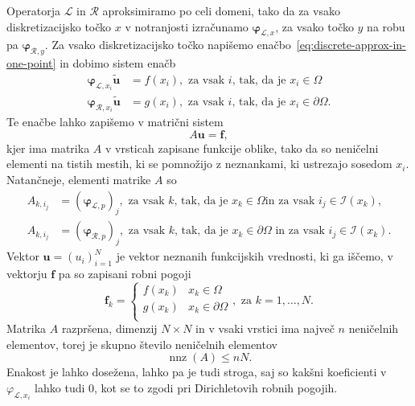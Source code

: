 \documentclass[12pt,a4paper,twoside]{article}
\theoremstyle{definition} %
\theoremstyle{plain} %
\numberwithin{equation}{section}
\newcommand{\Rc}{\mathcal{R}}
\newcommand{\I}{\mathcal{I}}
\renewcommand{\L}{\mathcal{L}}
\renewcommand{\b}{\boldsymbol}
\renewcommand{\phi}{\varphi}
\DeclareMathOperator{\nnz}{nnz}
\begin{document}
Operatorja $\L$ in $\Rc$ aproksimiramo po celi domeni, tako da za vsako diskretizacijsko točko $x$
v notranjosti izračunamo $\b\phi_{\L, x}$, za vsako točko $y$ na robu pa
$\b\phi_{\Rc, y}$. Za vsako diskretizacijsko točko napišemo
enačbo~\eqref{eq:discrete-approx-in-one-point} in dobimo sistem enačb
\begin{align}
  \b\phi_{\L, x_i} \b{\tilde{u}} &= f(x_i), \text{ za vsak $i$, tak, da je $x_i \in \Omega$ } \\
  \b\phi_{\Rc, x_i} \b{\tilde{u}} &= g(x_i), \text{ za vsak $i$, tak, da je $x_i \in \partial\Omega$.}
\end{align}
Te enačbe lahko zapišemo v matrični sistem
\begin{equation}
  A\b{u} = \b{f},
  \label{eq:discretized-system}
\end{equation}
kjer ima matrika $A$ v vrsticah zapisane funkcije oblike, tako da so neničelni elementi na tistih
mestih, ki se pomnožijo z neznankami, ki ustrezajo sosedom $x_i$. Natančneje, elementi matrike $A$
so
\begin{align}
  A_{k, i_j} &= (\b\phi_{\L, p})_j, \text{ za vsak $k$, tak, da je $x_k \in \Omega$
  in za vsak $i_j \in \I(x_k)$,} \\
  A_{k, i_j} &= (\b\phi_{\Rc, p})_j, \text{ za vsak $k$, tak, da je $x_k \in
  \partial\Omega$ in za vsak $i_j \in \I(x_k)$.}
\end{align}
Vektor $\b{u} = (u_i)_{i=1}^N$ je vektor neznanih funkcijskih vrednosti, ki ga
iščemo, v vektorju $\b{f}$ pa so zapisani robni pogoji
\begin{equation}
  \b f_k = \begin{cases}
    f(x_k) & x_k \in \Omega \\
    g(x_k) & x_k \in \partial\Omega \\
  \end{cases}, \text{ za $k = 1, \ldots, N$}.
\end{equation}
Matrika $A$ razpršena, dimenzij $N\times N$ in
v vsaki vrstici ima največ $n$ neničelnih
elementov, torej je skupno število neničelnih elementov
\begin{equation}
   \nnz(A) \leq nN.
\end{equation}
Enakost je lahko dosežena, lahko pa je tudi stroga, saj so kakšni koeficienti v $\phi_{\L, x_i}$ lahko
tudi 0, kot se to zgodi pri Dirichletovih robnih pogojih.
\end{document}
